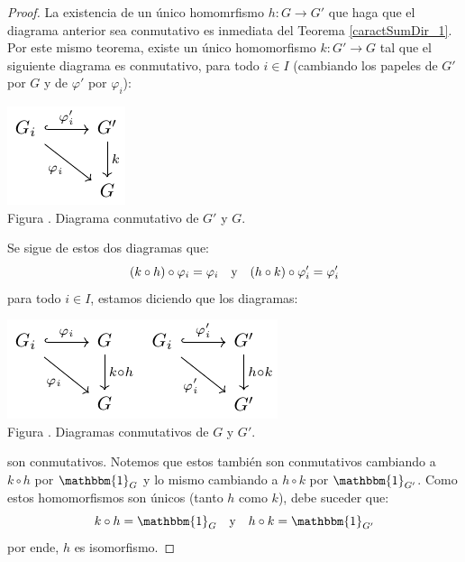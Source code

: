 \documentclass[12pt]{report}
\theoremstyle{largebreak}
\newcommand\cf[3]{\ensuremath{#1:#2\rightarrow#3}}
\newcommand{\bbm}[1]{\mathbbm{#1}}
\newcounter{figcount}
\begin{document}
    \begin{proof}
        La existencia de un único homomrfismo $\cf{h}{G}{G'}$ que haga que el diagrama anterior sea conmutativo es inmediata del Teorema \ref{caractSumDir_1}. Por este mismo teorema, existe un único homomorfismo $\cf{k}{G'}{G}$ tal que el siguiente diagrama es conmutativo, para todo $i\in I$ (cambiando los papeles de $G'$ por $G$ y de $\varphi'$ por $\varphi_i$):
        
        \begin{minipage}{\textwidth}
            \begin{center}
                \includegraphics[scale=1.5]{images/fig_4.pdf}\\
                Figura \thefigcount. Diagrama conmutativo de $G'$ y $G$.
            \end{center}
        \end{minipage}

        Se sigue de estos dos diagramas que:
        \begin{equation*}
            (k\circ h)\circ\varphi_i=\varphi_i\quad\textup{y}\quad(h\circ k)\circ\varphi_i'=\varphi_i'
        \end{equation*}
        para todo $i\in I$, estamos diciendo que los diagramas:
        
        \begin{minipage}{\textwidth}
            \begin{center}
                \includegraphics[scale=1.5]{images/fig_5.pdf}\\
                Figura \thefigcount. Diagramas conmutativos de $G$ y $G'$.
            \end{center}
        \end{minipage}

        son conmutativos. Notemos que estos también son conmutativos cambiando a $k\circ h $ por $\bbm{1}_G$ y lo mismo cambiando a $h\circ k$ por $\bbm{1}_{G'}$. Como estos homomorfismos son únicos (tanto $h$ como $k$), debe suceder que:
        \begin{equation*}
            k\circ h=\bbm{1}_G\quad\textup{y}\quad h\circ k=\bbm{1}_{G'}
        \end{equation*}
        por ende, $h$ es isomorfismo.
    \end{proof}
\end{document}
